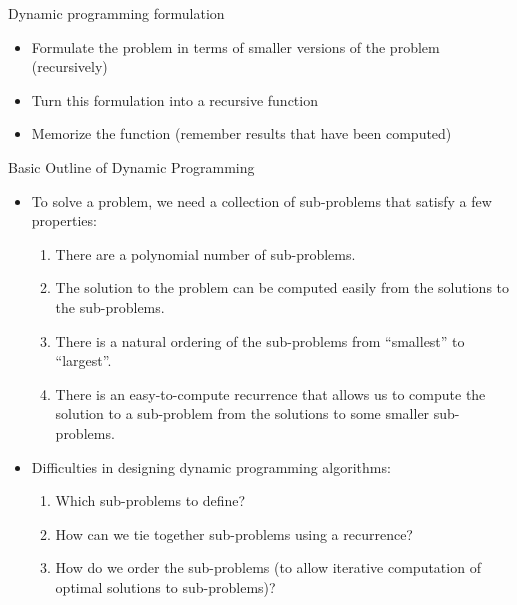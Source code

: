    \begin{frame}[fragile]{Dynamic programming formulation}

    \begin{itemize}
        \item Formulate the problem in terms of smaller versions of the problem (recursively)
        \item Turn this formulation into a recursive function
        \item Memorize the function (remember results that have been computed)
    \end{itemize}
\end{frame}

   \begin{frame}[fragile]{Basic Outline of Dynamic Programming}
  \begin{itemize}
  \item To solve a problem, we need a collection of sub-problems that
    satisfy a few properties:
    \begin{enumerate}
    \item There are a polynomial number of sub-problems.
    \item The solution to the problem can be computed easily from the
      solutions to the sub-problems.
    \item There is a natural ordering of the sub-problems from
      ``smallest'' to ``largest''.
    \item There is an easy-to-compute recurrence that allows us to
      compute the solution to a sub-problem from the solutions to some
      smaller sub-problems.
    \end{enumerate} 
  \item Difficulties in designing dynamic programming algorithms:
    \begin{enumerate}
    \item Which sub-problems to define?
    \item How can we tie together sub-problems using a recurrence?
    \item How do we order the sub-problems (to allow iterative
      computation of optimal solutions to sub-problems)?
    \end{enumerate}
  \end{itemize}
\end{frame}

